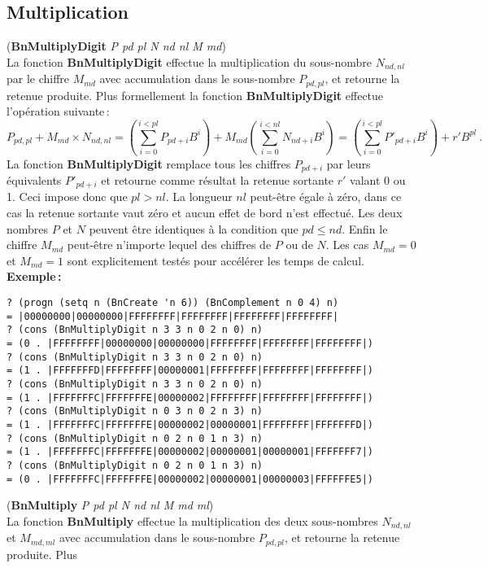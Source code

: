 \subsection{Multiplication}
({\bf BnMultiplyDigit} {\em P pd pl N nd nl M md})
\\[12pt]
La fonction {\bf BnMultiplyDigit} effectue la multiplication du sous-nombre
$N_{nd,nl}$ par le chiffre $M_{md}$ avec accumulation dans le
sous-nombre $P_{pd,pl}$, et retourne la retenue produite. Plus
formellement la fonction {\bf BnMultiplyDigit} effectue l'op\'eration
suivante\,:
\[ P_{pd,pl} + M_{md}\times N_{nd,nl} = (\sum_{i=0}^{i<pl}P_{pd+i} B^i) + M_{md}(\sum_{i=0}^{i<nl}N_{nd+i} B^i) = (\sum_{i=0}^{i<pl}P'_{pd+i} B^i) + r' B^{pl}\ .\]
La fonction {\bf BnMultiplyDigit} remplace tous les chiffres $P_{pd+i}$ par
leurs \'equivalents $P'_{pd+i}$ et retourne comme r\'esultat la retenue sortante
$r'$ valant 0 ou 1. Ceci impose donc que $pl>nl$. La longueur $nl$ peut-\^etre
\'egale \`a z\'ero, dans ce cas la retenue sortante vaut z\'ero et aucun effet
de bord n'est effectu\'e. Les deux nombres $P$ et $N$ peuvent \^etre identiques
\`a la condition que $pd \leq nd$. Enfin le chiffre $M_{md}$ peut-\^etre
n'importe lequel des chiffres de $P$ ou de $N$. Les cas $M_{md} = 0$ et
$M_{md} = 1$ sont explicitement test\'es pour acc\'el\'erer les temps de calcul.
\\[18pt]
{\bf Exemple\,:}
\begin{verbatim}
? (progn (setq n (BnCreate 'n 6)) (BnComplement n 0 4) n)
= |00000000|00000000|FFFFFFFF|FFFFFFFF|FFFFFFFF|FFFFFFFF|
? (cons (BnMultiplyDigit n 3 3 n 0 2 n 0) n)
= (0 . |FFFFFFFF|00000000|00000000|FFFFFFFF|FFFFFFFF|FFFFFFFF|)
? (cons (BnMultiplyDigit n 3 3 n 0 2 n 0) n)
= (1 . |FFFFFFFD|FFFFFFFF|00000001|FFFFFFFF|FFFFFFFF|FFFFFFFF|)
? (cons (BnMultiplyDigit n 3 3 n 0 2 n 0) n)
= (1 . |FFFFFFFC|FFFFFFFE|00000002|FFFFFFFF|FFFFFFFF|FFFFFFFF|)
? (cons (BnMultiplyDigit n 0 3 n 0 2 n 3) n)
= (1 . |FFFFFFFC|FFFFFFFE|00000002|00000001|FFFFFFFF|FFFFFFFD|)
? (cons (BnMultiplyDigit n 0 2 n 0 1 n 3) n)
= (1 . |FFFFFFFC|FFFFFFFE|00000002|00000001|00000001|FFFFFFF7|)
? (cons (BnMultiplyDigit n 0 2 n 0 1 n 3) n)
= (0 . |FFFFFFFC|FFFFFFFE|00000002|00000001|00000003|FFFFFFE5|)
\end{verbatim}
\vspace*{24pt}
({\bf BnMultiply} {\em P pd pl N nd nl M md ml})
\\[12pt]
La fonction {\bf BnMultiply} effectue la multiplication des deux
sous-nombres $N_{nd,nl}$ et $M_{md,ml}$ avec accumulation dans le
sous-nombre $P_{pd,pl}$, et retourne la retenue produite. Plus
